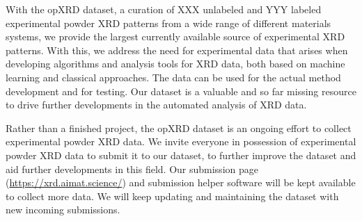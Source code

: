 With the opXRD dataset, a curation of XXX unlabeled and YYY labeled experimental powder XRD patterns from a wide range of different materials systems, we provide the largest currently available source of experimental XRD patterns. With this, we address the need for experimental data that arises when developing algorithms and analysis tools for XRD data, both based on machine learning and classical approaches. The data can be used for the actual method development and for testing. Our dataset is a valuable and so far missing resource to drive further developments in the automated analysis of XRD data.

Rather than a finished project, the opXRD dataset is an ongoing effort to collect experimental powder XRD data. We invite everyone in possession of experimental powder XRD data to submit it to our dataset, to further improve the dataset and aid further developments in this field. Our submission page (\url{https://xrd.aimat.science/}) and submission helper software will be kept available to collect more data. We will keep updating and maintaining the dataset with new incoming submissions.

